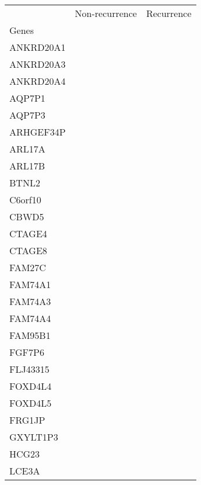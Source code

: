 \begin{tabular}{lcc}
\toprule
{} & Non-recurrence & Recurrence \\
Genes              &                &            \\
\midrule
ANKRD20A1          &                &            \\
ANKRD20A3          &                &            \\
ANKRD20A4          &                &            \\
AQP7P1             &                &            \\
AQP7P3             &                &            \\
ARHGEF34P          &                &            \\
ARL17A             &                &            \\
ARL17B             &                &            \\
BTNL2              &                &            \\
C6orf10            &                &            \\
CBWD5              &                &            \\
CTAGE4             &                &            \\
CTAGE8             &                &            \\
FAM27C             &                &            \\
FAM74A1            &                &            \\
FAM74A3            &                &            \\
FAM74A4            &                &            \\
FAM95B1            &                &            \\
FGF7P6             &                &            \\
FLJ43315           &                &            \\
FOXD4L4            &                &            \\
FOXD4L5            &                &            \\
FRG1JP             &                &            \\
GXYLT1P3           &                &            \\
HCG23              &                &            \\
LCE3A              &                &            \\

\end{tabular}
